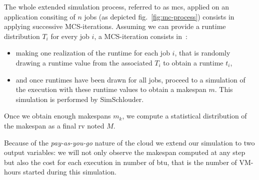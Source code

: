 \documentclass[10pt,conference,compsocconf]{IEEEtran}
\begin{document}
The whole extended simulation process,  referred to as \ac{mcs}, applied on an
application consiting of $n$ jobs (as depicted fig.~\ref{fig:mc-process})
consists in applying successive MCS-iterations. Assuming we can provide a
runtime distribution $T_i$ for every job $i$, a MCS-iteration consists in~:
\begin{itemize}
\item making one realization of the runtime  for each job $i$, that is randomly
  drawing a runtime value from the associated $T_i$ to obtain a runtime $t_i$,
\item and once runtimes have been drawn for all jobs, proceed to a simulation
  of the execution with these runtime values to obtain a makespan $m$. 
 This simulation is performed by SimSchlouder.
\end{itemize}
Once we obtain enough makespans $m_k$, we compute  a statistical distribution of
the makespan  as a final \ac{rv} noted $M$.


Because of the \emph{pay-as-you-go} nature of the cloud we extend our simulation
to two output variables: we will not only observe the makespan computed at any
step but also the cost for each execution in number of \ac{btu}, that is the
number of VM-hours started during this simulation.
\end{document}
